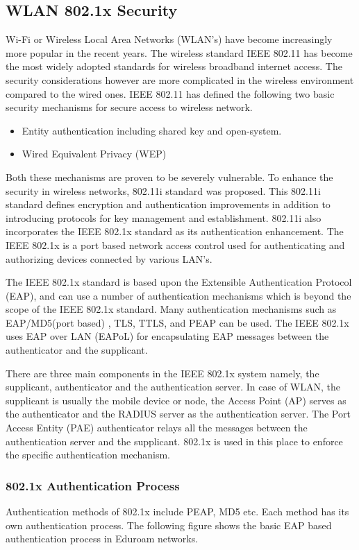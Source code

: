 \subsection{WLAN 802.1x Security \cite{WLAN_802.1x}} \label{802.1x}
Wi-Fi or Wireless Local Area Networks (WLAN’s) have become increasingly more popular in the recent years. The wireless standard IEEE 802.11 has become the most widely adopted standards for wireless broadband internet access. The security considerations however are more complicated in the wireless environment compared to the wired ones. IEEE 802.11 has defined the following two basic security mechanisms for secure access to wireless network.
\begin{itemize}
	\item Entity authentication including shared key and open-system.
	\item Wired Equivalent Privacy (WEP)
\end{itemize}
Both these mechanisms are proven to be severely vulnerable. To enhance the security in wireless networks, 802.11i standard was proposed. This 802.11i standard defines encryption and authentication improvements in addition to introducing protocols for key management and establishment. 802.11i also incorporates the IEEE 802.1x standard as its authentication enhancement. The IEEE 802.1x is a port based network access control used for authenticating and authorizing devices connected by various LAN’s.

The IEEE 802.1x standard is based upon the Extensible Authentication Protocol (EAP), and can use a number of authentication mechanisms which is beyond the scope of the IEEE 802.1x standard. Many authentication mechanisms such as EAP/MD5(port based) , TLS, TTLS, and PEAP can be used. The IEEE 802.1x uses EAP over LAN (EAPoL) for encapsulating EAP messages between the authenticator and the supplicant. 

There are three main components in the IEEE 802.1x system namely, the supplicant, authenticator and the authentication server. In case of WLAN, the supplicant is usually the mobile device or node, the Access Point (AP) serves as the authenticator and the RADIUS server as the authentication server.  The Port Access Entity (PAE) authenticator relays all the messages between the authentication server and the supplicant. 802.1x is used in this place to enforce the specific authentication mechanism. 

\subsubsection{802.1x Authentication Process} \label{WLAN_802.1x_auth}
Authentication methods of 802.1x include PEAP, MD5 etc. Each method has its own authentication process. The following figure shows the basic EAP based authentication process in Eduroam networks. 

